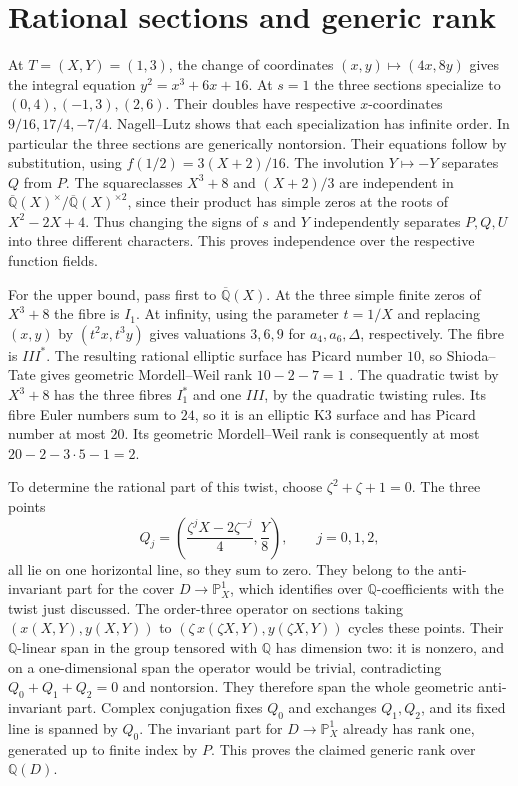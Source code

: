 \documentclass[11pt]{article}
\newcommand{\Q}{\mathbb Q}
\begin{document}
\section{Rational sections and generic rank}

At $T=(X,Y)=(1,3)$, the change of coordinates $(x,y)\mapsto(4x,8y)$
gives the integral equation $y^2=x^3+6x+16$. At $s=1$ the three sections
specialize to $(0,4),(-1,3),(2,6)$. Their doubles have respective
$x$-coordinates $9/16,17/4,-7/4$. Nagell--Lutz shows that each
specialization has infinite order. In particular the three sections are
generically nontorsion. Their equations follow by substitution, using
$f(1/2)=3(X+2)/16$. The involution $Y\mapsto-Y$ separates $Q$ from $P$.
The squareclasses $X^3+8$ and $(X+2)/3$ are independent in
$\overline{\Q}(X)^\times/\overline{\Q}(X)^{\times2}$, since their
product has simple zeros at the roots of $X^2-2X+4$. Thus changing the
signs of $s$ and $Y$ independently separates $P,Q,U$ into three
different characters. This proves independence over the respective
function fields.

For the upper bound, pass first to $\overline{\Q}(X)$. At the three
simple finite zeros of $X^3+8$ the fibre is $I_1$. At infinity, using
the parameter $t=1/X$ and replacing $(x,y)$ by $(t^2x,t^3y)$ gives
valuations $3,6,9$ for $a_4,a_6,\Delta$, respectively. The fibre is
$III^*$. The resulting rational elliptic surface has Picard number $10$,
so Shioda--Tate gives geometric Mordell--Weil rank $10-2-7=1$
\cite{SS}. The quadratic twist by $X^3+8$ has the three fibres $I_1^*$
and one $III$, by the quadratic twisting rules. Its fibre Euler numbers
sum to $24$, so it is an elliptic K3 surface and has Picard number at
most $20$. Its geometric Mordell--Weil rank is consequently at most
$20-2-3\cdot5-1=2$.

To determine the rational part of this twist, choose
$\zeta^2+\zeta+1=0$. The three points
\[
 Q_j=\left(\frac{\zeta^jX-2\zeta^{-j}}4,\frac{Y}{8}\right),
 \qquad j=0,1,2,
\]
all lie on one horizontal line, so they sum to zero. They belong to the
anti-invariant part for the cover $D\to\mathbb P^1_X$, which identifies
over $\Q$-coefficients with the twist just discussed. The order-three
operator on sections taking $(x(X,Y),y(X,Y))$ to
$(\zeta\,x(\zeta X,Y),y(\zeta X,Y))$ cycles these points. Their
$\Q$-linear span in the group tensored with $\Q$ has dimension two:
it is nonzero, and on a one-dimensional span the operator would be
trivial, contradicting $Q_0+Q_1+Q_2=0$ and nontorsion. They therefore
span the whole geometric anti-invariant part. Complex conjugation fixes
$Q_0$ and exchanges $Q_1,Q_2$, and its fixed line is spanned by $Q_0$.
The invariant part for $D\to\mathbb P^1_X$ already has rank one, generated
up to finite index by $P$. This proves the claimed generic rank over
$\Q(D)$.
\end{document}
